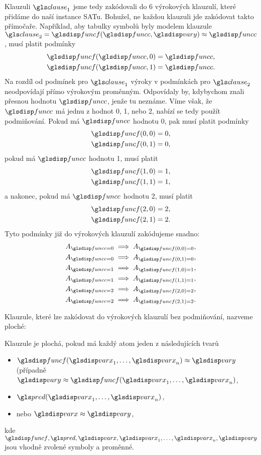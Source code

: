 Klauzuli $\clause_1$ jsme tedy zakódovali do 6 výrokových klauzulí,
které přidáme do naší instance SATu.
Bohužel, ne každou klauzuli jde zakódovat takto přímočaře.
Například, aby tabulky symbolů byly modelem klauzule
$\clause_2 = \func(\funcC, \varY) \approx \funcC$, musí platit podmínky
\begin{gather*}
  \func(\funcC, 0) = \funcC, \\
  \func(\funcC, 1) = \funcC.
\end{gather*}
Na rozdíl od podmínek pro $\clause_1$ výroky v podmínkách pro $\clause_2$
neodpovídají přímo výrokovým proměnným.
Odpovídaly by, kdybychom znali přesnou hodnotu $\funcC$, jenže tu neznáme.
Víme však, že $\funcC$ má jednu z hodnot 0, 1, nebo 2, nabízí se tedy
použít podmiňování. Pokud má $\funcC$ hodnotu 0, pak musí platit
podmínky
\begin{gather*}
  \func(0, 0) = 0, \\
  \func(0, 1) = 0,
\end{gather*}
pokud má $\funcC$ hodnotu 1, musí platit
\begin{gather*}
  \func(1, 0) = 1, \\
  \func(1, 1) = 1,
\end{gather*}
a nakonec, pokud má $\funcC$ hodnotu 2, musí platit
\begin{gather*}
  \func(2, 0) = 2, \\
  \func(2, 1) = 2.
\end{gather*}
Tyto podmínky již do výrokových klauzulí zakódujeme snadno:
\begin{gather*}
  A_{\funcC = 0} \implies A_{\func(0, 0) = 0}, \\
  A_{\funcC = 0} \implies A_{\func(0, 1) = 0}, \\
  A_{\funcC = 1} \implies A_{\func(1, 0) = 1}, \\
  A_{\funcC = 1} \implies A_{\func(1, 1) = 1}, \\
  A_{\funcC = 2} \implies A_{\func(2, 0) = 2}, \\
  A_{\funcC = 2} \implies A_{\func(2, 1) = 2}.
\end{gather*}

Klauzule, které lze zakódovat do výrokových klauzulí
bez podmiňování, nazveme ploché:

\begin{defn}
Klauzule je plochá, pokud má každý atom jeden z následujících tvarů
\begin{itemize}
\item $\func(\var_1 \comdots \var_n) \approx \varY$
  (případně $\varY \approx \func(\var_1 \comdots \var_n)$,
\item $\pred(\var_1 \comdots \var_n)$,
\item nebo $\var \approx \varY$,
\end{itemize}
kde $\func, \pred, \var, \var_1 \comdots \var_n, \varY$ jsou
vhodně zvolené symboly a proměnné.
\end{defn}

